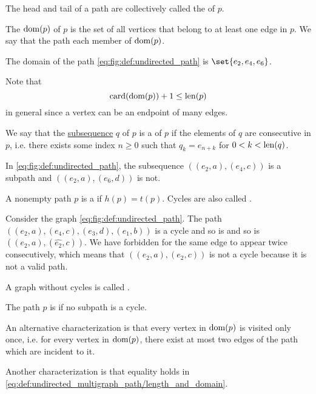 \begin{definition}
\begin{thmenum}
    The head and tail of a path are collectively called the  of \( p \).

     The  \( \operatorname{dom}(p) \) of \( p \) is the set of all vertices that belong to at least one edge in \( p \). We say that the path  each member of \( \operatorname{dom}(p) \).

    The domain of the path \eqref{eq:fig:def:undirected_path} is \( \set{ e_2, e_4, e_6 } \).

    Note that
    \begin{equation}\label{eq:def:undirected_multigraph_path/length_and_domain}
      \operatorname{card}(\operatorname{dom}(p)) + 1 \leq \operatorname{len}(p)
    \end{equation}
    in general since a vertex can be an endpoint of many edges.

     We say that the \hyperref[def:subsequence]{subsequence} \( q \) of \( p \) is a  of \( p \) if the elements of \( q \) are consecutive in \( p \), i.e. there exists some index \( n \geq 0 \) such that \( q_k = e_{n + k} \) for \( 0 < k < \operatorname{len}(q) \).

    In \eqref{eq:fig:def:undirected_path}, the subsequence \( ((e_2, a), (e_4, c)) \) is a subpath and \( ((e_2, a), (e_6, d)) \) is not.

     A nonempty path \( p \) is a  if \( h(p) = t(p) \). Cycles are also called .

    Consider the graph \eqref{eq:fig:def:undirected_path}. The path \( ((e_2, a), (e_4, c), (e_3, d), (e_1, b)) \) is a cycle and so is and so is \( ((e_2, a), (\widehat{e_2}, c)) \). We have forbidden for the same edge to appear twice consecutively, which means that \( ((e_2, a), (e_2, c)) \) is not a cycle because it is not a valid path.

    A graph without cycles is called .

     The path \( p \) is  if no subpath is a cycle.

    An alternative characterization is that every vertex in \( \operatorname{dom}(p) \) is visited only once, i.e. for every vertex in \( \operatorname{dom}(p) \), there exist at most two edges of the path which are incident to it.

    Another characterization is that equality holds in \eqref{eq:def:undirected_multigraph_path/length_and_domain}.


\end{thmenum}
\end{definition}
